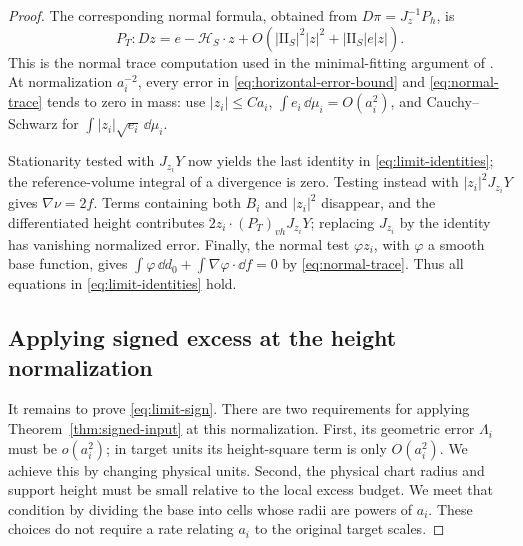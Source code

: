 \begin{proof}
The corresponding normal formula, obtained from $D\pi=J_z^{-1}P_h$, is
\begin{equation}\label{eq:normal-trace}
 P_T:Dz=e-\mathcal H_S\cdot z
       +O(|\mathrm{II}_S|^2|z|^2+|\mathrm{II}_S|e|z|).
\end{equation}
This is the normal trace computation used in the minimal-fitting
argument of \cite[Equation~(7.9)]{AE}. At normalization $a_i^{-2}$, every
error in \eqref{eq:horizontal-error-bound} and
\eqref{eq:normal-trace} tends to zero in mass: use $|z_i|\le Ca_i$,
$\int e_i\,\dd\mu_i=O(a_i^2)$, and Cauchy--Schwarz for
$\int |z_i|\sqrt{e_i}\,\dd\mu_i$.

Stationarity tested with $J_{z_i}Y$ now yields the last identity in
\eqref{eq:limit-identities}; the reference-volume integral of a divergence
is zero. Testing instead with $|z_i|^2J_{z_i}Y$ gives
$\nabla\nu=2f$. Terms containing both $B_i$ and $|z_i|^2$ disappear,
and the differentiated height contributes
$2z_i\cdot(P_T)_{vh}J_{z_i}Y$; replacing $J_{z_i}$ by the identity has
vanishing normalized error. Finally, the normal test $\varphi z_i$,
with $\varphi$ a smooth base function, gives
$\int\varphi\,\dd d_0+\int\nabla\varphi\cdot\dd f=0$ by
\eqref{eq:normal-trace}. Thus all equations in
\eqref{eq:limit-identities} hold.

\subsection*{Applying signed excess at the height normalization}

It remains to prove \eqref{eq:limit-sign}. There are two requirements
for applying Theorem~\ref{thm:signed-input} at this normalization.
First, its geometric error $\Lambda_i$ must be $o(a_i^2)$; in target
units its height-square term is only $O(a_i^2)$. We achieve this by
changing physical units. Second, the physical chart radius and support
height must be small relative to the local excess budget. We meet that
condition by dividing the base into cells whose radii are powers of
$a_i$. These choices do not require a rate relating $a_i$ to the
original target scales.


\end{proof}
